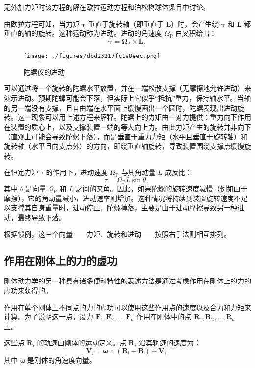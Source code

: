 无外加力矩时该方程的解在欧拉运动方程和泊松椭球体条目中讨论。

由欧拉方程可知，当力矩 \(\boldsymbol{\tau}\) 垂直于旋转轴（即垂直于 \(\mathbf{L}\)）时，会产生绕 \(\boldsymbol{\tau}\) 和 \(\mathbf{L}\) 都垂直的轴的旋转。这种运动称为进动。进动的角速度 \(\Omega_{\mathrm{P}}\) 由叉积给出：
\[
\boldsymbol{\tau} = \boldsymbol{\Omega}_{\mathrm{P}} \times \mathbf{L}.~
\]
\begin{figure}[ht]
\centering
\texttt{[image: ./figures/dbd23217fc1a8eec.png]}
\caption{陀螺仪的进动} \label{fig_GTDL_6}
\end{figure}
可以通过将一个旋转的陀螺水平放置，并在一端松散支撑（无摩擦地允许进动）来演示进动。预期陀螺可能会下落，但实际上它似乎“抵抗”重力，保持轴水平。当轴的另一端没有支撑，且自由端在水平面上缓慢画出一个圆时，陀螺表现出进动旋转。这一现象可以用上述方程来解释。陀螺上的力矩由一对力提供：重力向下作用在装置的质心上，以及支撑装置一端的等大向上力。由此力矩产生的旋转并非向下（直观上可能会导致陀螺下落），而是垂直于重力力矩（水平且垂直于旋转轴）和旋转轴（水平且向支点外）的方向，即绕垂直轴旋转，导致装置围绕支撑点缓慢旋转。

在恒定力矩 \(\tau\) 的作用下，进动速度 \(\Omega_{\mathrm{P}}\) 与其角动量 \(L\) 成反比：
\[
\tau = \Omega_{\mathrm{P}} L \sin \theta,~
\]
其中 \(\theta\) 是向量 \(\Omega_{\mathrm{P}}\) 和 \(L\) 之间的夹角。因此，如果陀螺的旋转速度减慢（例如由于摩擦），它的角动量减小，进动速率则增加。这种情况将持续到装置旋转速度不足以支撑其自身重量时，进动停止，陀螺掉落，主要是由于进动摩擦导致另一种进动，最终导致下落。

根据惯例，这三个向量——力矩、旋转和进动——按照右手法则相互排列。
\subsection{作用在刚体上的力的虚功}
刚体动力学的另一种具有诸多便利特性的表述方法是通过考虑作用在刚体上的力的虚功来获得的。

作用在单个刚体上不同点的力的虚功可以使用这些作用点的速度以及合力和力矩来计算。为了说明这一点，设力 \( \mathbf{F}_1, \mathbf{F}_2, \dots, \mathbf{F}_n \) 作用在刚体中的点 \( \mathbf{R}_1, \mathbf{R}_2, \dots, \mathbf{R}_n \) 上。

这些点 \( \mathbf{R}_i \) 的轨迹由刚体的运动定义。点 \( \mathbf{R}_i \) 沿其轨迹的速度为：
\[
\mathbf{V}_i = \boldsymbol{\omega} \times (\mathbf{R}_i - \mathbf{R}) + \mathbf{V},~
\]
其中 \( \boldsymbol{\omega} \) 是刚体的角速度向量。
